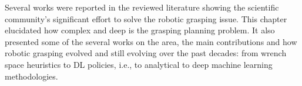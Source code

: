 Several works were reported in the reviewed literature showing the scientific community's significant effort to solve the robotic grasping issue. This chapter elucidated how complex and deep is the grasping planning problem. It also presented some of the several works on the area, the main contributions and how robotic grasping evolved and still evolving over the past decades: from wrench space heuristics to {DL} policies, i.e., to analytical to deep machine learning methodologies. 








